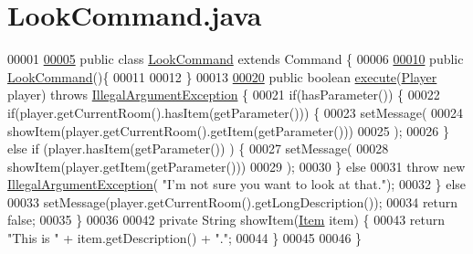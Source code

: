 \hypertarget{LookCommand_8java_source}{\section{Look\-Command.\-java}
}

\begin{DoxyCode}
00001 
\hypertarget{LookCommand_8java_source_l00005}{}\hyperlink{classLookCommand}{00005} \textcolor{keyword}{public} \textcolor{keyword}{class }\hyperlink{classLookCommand}{LookCommand} \textcolor{keyword}{extends} Command \{
00006 
\hypertarget{LookCommand_8java_source_l00010}{}\hyperlink{classLookCommand_a45ae975cf9e99310d630cfe440d5ce75}{00010}     \textcolor{keyword}{public} \hyperlink{classLookCommand_a45ae975cf9e99310d630cfe440d5ce75}{LookCommand}()\{
00011 
00012     \}
00013 
\hypertarget{LookCommand_8java_source_l00020}{}\hyperlink{classLookCommand_a3b67eafb4956b1369904b273303ee7df}{00020}     \textcolor{keyword}{public} \textcolor{keywordtype}{boolean} \hyperlink{classLookCommand_a3b67eafb4956b1369904b273303ee7df}{execute}(\hyperlink{classPlayer}{Player} player) \textcolor{keywordflow}{throws} 
      \hyperlink{classIllegalArgumentException}{IllegalArgumentException} \{
00021         \textcolor{keywordflow}{if}(hasParameter()) \{
00022             \textcolor{keywordflow}{if}(player.getCurrentRoom().hasItem(getParameter())) \{
00023                 setMessage(
00024                         showItem(player.getCurrentRoom().getItem(getParameter()))
00025                         );
00026             \} \textcolor{keywordflow}{else} \textcolor{keywordflow}{if} (player.hasItem(getParameter()) ) \{
00027                 setMessage(
00028                         showItem(player.getItem(getParameter()))
00029                         );
00030             \} \textcolor{keywordflow}{else}
00031                 \textcolor{keywordflow}{throw} \textcolor{keyword}{new} \hyperlink{classIllegalArgumentException}{IllegalArgumentException}( \textcolor{stringliteral}{"I'm not sure you want to look
       at that."});
00032         \} \textcolor{keywordflow}{else}
00033             setMessage(player.getCurrentRoom().getLongDescription());
00034         \textcolor{keywordflow}{return} \textcolor{keyword}{false};
00035     \}
00036 
00042     \textcolor{keyword}{private} String showItem(\hyperlink{classItem}{Item} item) \{
00043         \textcolor{keywordflow}{return} \textcolor{stringliteral}{"This is "} + item.getDescription() + \textcolor{stringliteral}{"."};
00044     \}
00045 
00046 \}
\end{DoxyCode}
